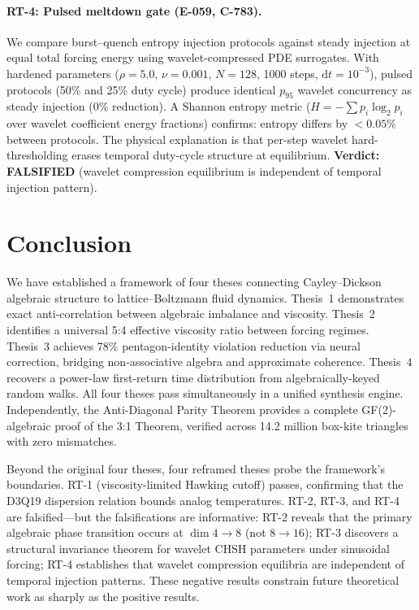 \documentclass[12pt]{article}
\theoremstyle{definition}
\theoremstyle{plain}
\theoremstyle{remark}
\begin{document}
\paragraph{RT-4: Pulsed meltdown gate (E-059, C-783).}
We compare burst--quench entropy injection protocols against steady injection
at equal total forcing energy using wavelet-compressed PDE surrogates.  With
hardened parameters ($\rho = 5.0$, $\nu = 0.001$, $N = 128$, 1000 steps,
$\mathrm{d}t = 10^{-3}$), pulsed protocols (50\% and 25\% duty cycle)
produce identical $p_{95}$ wavelet concurrency as steady injection ($0\%$
reduction).  A Shannon entropy metric ($H = -\sum p_i \log_2 p_i$ over
wavelet coefficient energy fractions) confirms: entropy differs by $< 0.05\%$
between protocols.  The physical explanation is that per-step wavelet
hard-thresholding erases temporal duty-cycle structure at equilibrium.
\textbf{Verdict: FALSIFIED} (wavelet compression equilibrium is
independent of temporal injection pattern).

\section{Conclusion}
\label{sec:conclusion}

We have established a framework of four theses connecting Cayley--Dickson
algebraic structure to lattice--Boltzmann fluid dynamics.  Thesis~1
demonstrates exact anti-correlation between algebraic imbalance and
viscosity.  Thesis~2 identifies a universal 5:4 effective viscosity ratio
between forcing regimes.  Thesis~3 achieves 78\% pentagon-identity
violation reduction via neural correction, bridging non-associative algebra
and approximate coherence.  Thesis~4 recovers a power-law first-return time distribution
from algebraically-keyed random walks.  All four theses pass simultaneously
in a unified synthesis engine.  Independently, the Anti-Diagonal Parity
Theorem provides a complete GF(2)-algebraic proof of the 3:1 Theorem,
verified across 14.2 million box-kite triangles with zero mismatches.

Beyond the original four theses, four reframed theses probe the framework's
boundaries.  RT-1 (viscosity-limited Hawking cutoff) passes, confirming that
the D3Q19 dispersion relation bounds analog temperatures.  RT-2, RT-3, and
RT-4 are falsified---but the falsifications are informative: RT-2 reveals
that the primary algebraic phase transition occurs at $\dim 4 \to 8$ (not
$8 \to 16$); RT-3 discovers a structural invariance theorem for wavelet CHSH
parameters under sinusoidal forcing; RT-4 establishes that wavelet
compression equilibria are independent of temporal injection patterns.  These
negative results constrain future theoretical work as sharply as the positive
results.
\end{document}
